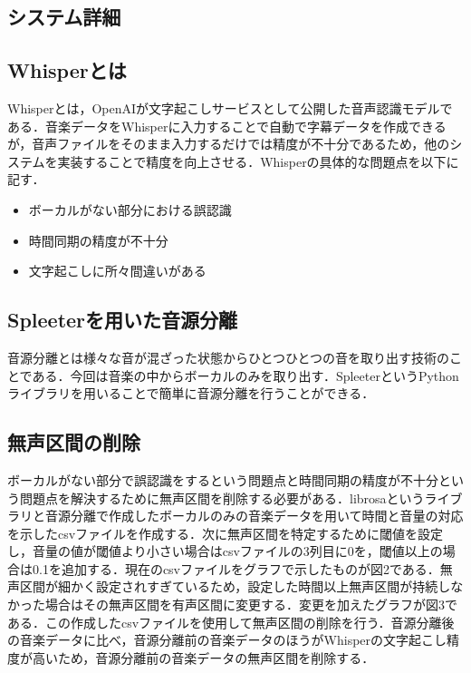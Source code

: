 \begin{multicols*}{2}
\section{システム詳細}

\subsection{Whisperとは}
Whisperとは，OpenAIが文字起こしサービスとして公開した音声認識モデルである．音楽データをWhisperに入力することで自動で字幕データを作成できるが，音声ファイルをそのまま入力するだけでは精度が不十分であるため，他のシステムを実装することで精度を向上させる．Whisperの具体的な問題点を以下に記す．

\begin{itemize}
\item ボーカルがない部分における誤認識
\item 時間同期の精度が不十分
\item 文字起こしに所々間違いがある
\end{itemize}

\subsection{Spleeterを用いた音源分離}
音源分離とは様々な音が混ざった状態からひとつひとつの音を取り出す技術のことである．今回は音楽の中からボーカルのみを取り出す．SpleeterというPythonライブラリを用いることで簡単に音源分離を行うことができる．

\subsection{無声区間の削除}
ボーカルがない部分で誤認識をするという問題点と時間同期の精度が不十分という問題点を解決するために無声区間を削除する必要がある．librosaというライブラリと音源分離で作成したボーカルのみの音楽データを用いて時間と音量の対応を示したcsvファイルを作成する．次に無声区間を特定するために閾値を設定し，音量の値が閾値より小さい場合はcsvファイルの3列目に0を，閾値以上の場合は0.1を追加する．現在のcsvファイルをグラフで示したものが図2である．無声区間が細かく設定されすぎているため，設定した時間以上無声区間が持続しなかった場合はその無声区間を有声区間に変更する．変更を加えたグラフが図3である．この作成したcsvファイルを使用して無声区間の削除を行う．音源分離後の音楽データに比べ，音源分離前の音楽データのほうがWhisperの文字起こし精度が高いため，音源分離前の音楽データの無声区間を削除する．


\end{multicols*}
